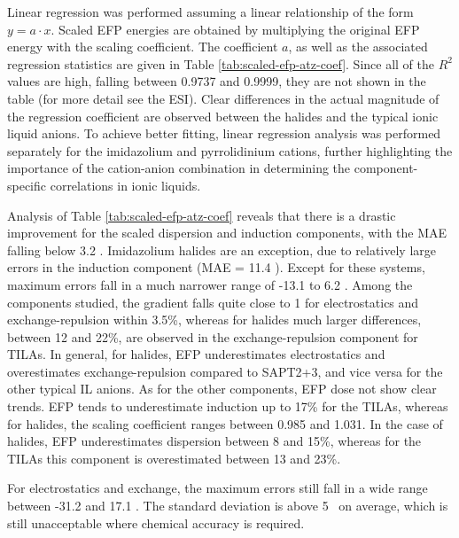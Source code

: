 Linear regression was performed assuming a linear relationship of the form $ y = a \cdot x $.
Scaled EFP energies are obtained by multiplying the original EFP energy with the scaling coefficient.
The coefficient $a$, as well as the associated regression statistics are given in Table \ref{tab:scaled-efp-atz-coef}.
Since all of the $R^2$ values are high, falling between 0.9737 and 0.9999, they are not shown in the table (for more detail see the ESI).
Clear differences in the actual magnitude of the regression coefficient are observed between the halides and the typical ionic liquid anions.
To achieve better fitting, linear regression analysis was performed separately for the imidazolium and pyrrolidinium cations, further highlighting the importance of the cation-anion combination in determining the component-specific correlations in ionic liquids.


Analysis of Table \ref{tab:scaled-efp-atz-coef} reveals that there is a drastic improvement for the scaled dispersion and induction components, with the MAE falling below 3.2 \enUnit. 
Imidazolium halides are an exception, due to relatively large errors in the induction component (MAE = 11.4 \enUnit).
Except for these systems, maximum errors fall in a much narrower range of -13.1 to 6.2 \enUnit.
Among the components studied, the gradient falls quite close to 1 for electrostatics and exchange-repulsion within 3.5\%, whereas for halides much larger differences, between 12 and 22\%, are observed in the exchange-repulsion component for TILAs.
In general, for halides, EFP underestimates electrostatics and overestimates exchange-repulsion compared to SAPT2+3, and vice versa for the other typical IL anions.
As for the other components, EFP dose not show clear trends.
EFP tends to  underestimate induction up to 17\% for the TILAs, whereas for halides, the scaling coefficient ranges between 0.985 and 1.031.
In the case of halides, EFP underestimates dispersion between 8 and 15\%, whereas for the TILAs this component is overestimated between 13 and 23\%. 


For electrostatics and exchange, the maximum errors still fall in a wide range between -31.2 and 17.1 \enUnit.
The standard deviation is above 5 \enUnit~on average, which is still unacceptable where chemical accuracy is required.


